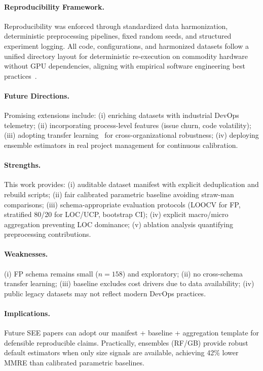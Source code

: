 \documentclass{ieeeaccess}
\begin{document}
\paragraph{Reproducibility Framework.}
Reproducibility was enforced through standardized data harmonization, deterministic preprocessing pipelines, fixed random seeds, and structured experiment logging. All code, configurations, and harmonized datasets follow a unified directory layout for deterministic re-execution on commodity hardware without GPU dependencies, aligning with empirical software engineering best practices~\cite{cruz2019open,lopez2021empirical}.

\paragraph{Future Directions.}
Promising extensions include: (i) enriching datasets with industrial DevOps telemetry; (ii) incorporating process-level features (issue churn, code volatility); (iii) adopting transfer learning~\cite{yu2021transfer} for cross-organizational robustness; (iv) deploying ensemble estimators in real project management for continuous calibration.

\paragraph{Strengths.}
This work provides: (i) auditable dataset manifest with explicit deduplication and rebuild scripts; (ii) fair calibrated parametric baseline avoiding straw-man comparisons; (iii) schema-appropriate evaluation protocols (LOOCV for FP, stratified 80/20 for LOC/UCP, bootstrap CI); (iv) explicit macro/micro aggregation preventing LOC dominance; (v) ablation analysis quantifying preprocessing contributions.

\paragraph{Weaknesses.}
(i) FP schema remains small ($n=158$) and exploratory; (ii) no cross-schema transfer learning; (iii) baseline excludes cost drivers due to data availability; (iv) public legacy datasets may not reflect modern DevOps practices.

\paragraph{Implications.}
Future SEE papers can adopt our manifest + baseline + aggregation template for defensible reproducible claims. Practically, ensembles (RF/GB) provide robust default estimators when only size signals are available, achieving 42\% lower MMRE than calibrated parametric baselines.
\end{document}
